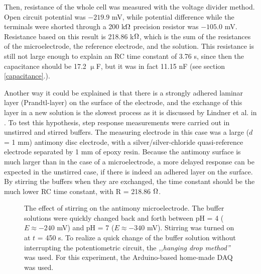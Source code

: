 Then, resistance of the whole cell was measured with the voltage divider method.
Open circuit potential was $-219.9$ mV, while potential difference while the terminals were shorted through a 200 k$\ohm$ precision resistor was $-105.0$ mV.
Resistance based on this result is 218.86 k$\ohm$, which is the sum of the resistances of the microelectrode, the reference electrode, and the solution.
This resistance is still not large enough to explain an RC time constant of 3.76 s, since then the capacitance should be 17.2 $\upmu$F, but it was in fact 11.15 nF (see section \ref{capacitance}.).

Another way it could be explained is that there is a strongly adhered laminar layer (Prandtl-layer) on the surface of the electrode, and the exchange of this layer in a new solution is the slowest process as it is discussed by Lindner et al. in \cite{lindner1976response}.
To test this hypothesis, step response measurements were carried out in unstirred and stirred buffers. The measuring electrode in this case was a large ($d$ = 1 mm) antimony disc electrode, with a silver/silver-chloride quasi-reference electrode separated by 1 mm of epoxy resin. Because the antimony surface is much larger than in the case of a microelectrode, a more delayed response can be expected in the unstirred case, if there is indeed an adhered layer on the surface. By stirring the buffers when they are exchanged, the time constant should be the much lower RC time constant, with R = 218.86 $\ohm$. 

\begin{figure}
\centering
{}
\caption[The effect of stirring on the antimony microelectrode.]{The effect of stirring on the antimony microelectrode.
The buffer solutions were quickly changed back and forth between pH = 4 ($E \approx -240$ mV) and pH = 7 ($E \approx -340$ mV).
Stirring was turned on at $t$ = 450 s.
To realize a quick change of the buffer solution without interrupting the potentiometric circuit, the \emph{,,hanging drop method''} was used. For this experiment, the Arduino-based home-made DAQ was used.}
\label{fig:stirring}
\end{figure}

